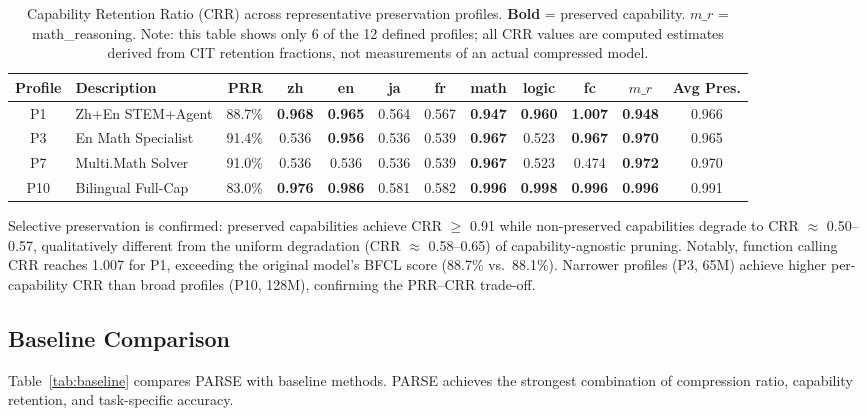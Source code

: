 \documentclass[twocolumn]{article}
\begin{document}
\begin{table}[t]
\caption{Capability Retention Ratio (CRR) across representative preservation profiles. \textbf{Bold} = preserved capability. $m\_r$ = math\_reasoning. Note: this table shows only 6 of the 12 defined profiles; all CRR values are computed estimates derived from CIT retention fractions, not measurements of an actual compressed model.}
\label{tab:results}
\centering
\small
\begin{tabular}{cl|r|cccc|cc|cc|c}
\toprule
Profile & Description & PRR & zh & en & ja & fr & math & logic & fc & $m\_r$ & Avg Pres. \\
\midrule
P1 & Zh+En STEM+Agent & 88.7\% & \textbf{0.968} & \textbf{0.965} & 0.564 & 0.567 & \textbf{0.947} & \textbf{0.960} & \textbf{1.007} & \textbf{0.948} & 0.966 \\
P3 & En Math Specialist & 91.4\% & 0.536 & \textbf{0.956} & 0.536 & 0.539 & \textbf{0.967} & 0.523 & \textbf{0.967} & \textbf{0.970} & 0.965 \\
P7 & Multi.Math Solver & 91.0\% & 0.536 & 0.536 & 0.536 & 0.539 & \textbf{0.967} & 0.523 & 0.474 & \textbf{0.972} & 0.970 \\
P10 & Bilingual Full-Cap & 83.0\% & \textbf{0.976} & \textbf{0.986} & 0.581 & 0.582 & \textbf{0.996} & \textbf{0.998} & \textbf{0.996} & \textbf{0.996} & 0.991 \\
\bottomrule
\end{tabular}
\end{table}

Selective preservation is confirmed: preserved capabilities achieve CRR $\geq$ 0.91 while non-preserved capabilities degrade to CRR $\approx$ 0.50--0.57, qualitatively different from the uniform degradation (CRR $\approx$ 0.58--0.65) of capability-agnostic pruning. Notably, function calling CRR reaches 1.007 for P1, exceeding the original model's BFCL score (88.7\% vs.\ 88.1\%). Narrower profiles (P3, 65M) achieve higher per-capability CRR than broad profiles (P10, 128M), confirming the PRR--CRR trade-off.

\subsection{Baseline Comparison}

Table~\ref{tab:baseline} compares PARSE with baseline methods. PARSE achieves the strongest combination of compression ratio, capability retention, and task-specific accuracy.
\end{document}
